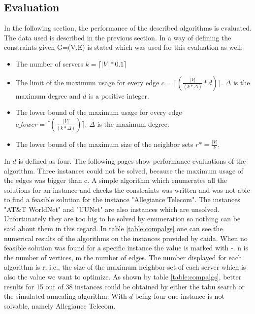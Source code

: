 \documentclass [12pt]{article}
\begin{document}
  \subsection{Evaluation}
  In the following section, the performance of the described algorithms is evaluated. The data used is described in the previous section.
  In \cite{mirrorserver} a way of defining the constraints given G=(V,E) is stated which was used for this evaluation as well: 
  \begin{itemize}
    \item{The number of servers $k = \lceil |V| * 0.1 \rceil$  }
    \item{The limit of the maximum usage for every edge $c = \lceil(\frac{|V|}{(k*\Delta)}*d)\rceil$. $\Delta$ is the maximum degree and $d$ is a positive integer.}
    \item{The lower bound of the maximum usage for every edge $c\_lower = \lceil(\frac{|V|}{(k*\Delta)})\rceil$. $\Delta$ is the maximum degree.}
    \item{The lower bound of the maximum size of the neighbor sets $r*=\frac{|V|}{k}$.}
  \end{itemize}
  In \cite{mirrorserver} $d$ is defined as four. %
  The following pages show performance evaluations of the algorithm.  Three instances could not be solved, because the maximum usage of the 
  edges was bigger than c. A simple algorithm which enumerates all the solutions for an instance and checks the constraints was written and was not able to find a feasible solution 
  for the instance "Allegiance Telecom". The instances  "AT\&T WorldNet" and "UUNet" are also instances which are unsolved. Unfortunately they are too big to be solved by enumeration so
  nothing can be said about them in this regard. In table \ref{table:compalgs} one can see the numerical results of the algorithms on the instances provided by caida. When no
  feasible solution was found for a specific instance the value is marked with -. n is the number of vertices, m the number of edges. The number displayed for each algorithm is r, i.e.,%
  the size of the maximum neighbor set of each server which is also the value we want to optimize. As shown by table \ref{table:compalgs}, better results for 15 out of 38 instances could be obtained 
  by either the tabu search or the simulated annealing algorithm. With $d$ being four one instance is not solvable, namely Allegiance Telecom. 
\end{document}
